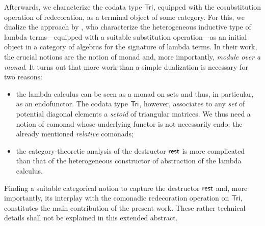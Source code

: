 \documentclass{llncs}
\begin{document}
 Afterwards, we characterize the codata type $\mathsf{Tri}$, equipped with the cosubstitution operation of redecoration, as a terminal object of some category.
 For this, we dualize the approach by \textcite{DBLP:journals/iandc/HirschowitzM10},
 who characterize the heterogeneous inductive type of lambda terms---equipped with a suitable substitution operation---as an initial object in
 a category of algebras for the signature of lambda terms.
 In their work, the crucial notions are the notion of monad and, more importantly, \emph{module over a monad}.
 It turns out that more work than a simple dualization is necessary for two reasons:
 \begin{itemize}
  \item the lambda calculus can be seen as a monad on sets and thus, in particular, as an endofunctor.
        The codata type $\mathsf{Tri}$, however, associates to any \emph{set} of potential diagonal elements a \emph{setoid}
        of triangular matrices. We thus need a notion of comonad whose underlying functor is not necessarily endo: the 
        already mentioned \emph{relative} comonads;
  \item the category-theoretic analysis of the destructor $\mathsf{rest}$ is more complicated than that of the heterogeneous 
           constructor of abstraction of the lambda calculus.
 \end{itemize}
 Finding a suitable categorical notion to capture the destructor $\mathsf{rest}$ and, more importantly, its interplay with
 the comonadic redecoration operation on $\mathsf{Tri}$, constitutes the main contribution of the present work.
 These rather technical details shall not be explained in this extended abstract.
 
 
\end{document}
